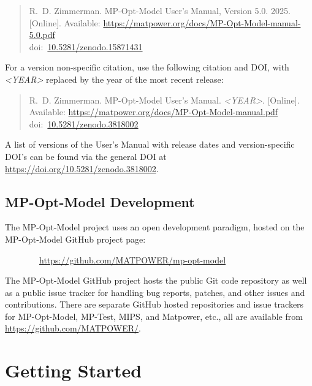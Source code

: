 \documentclass[12pt]{article}
\newcommand{\matpower}[0]{{\sc Matpower}}
\newcommand{\mptest}[0]{{MP-Test}}
\newcommand{\mips}[0]{{MIPS}}
\newcommand{\mpom}[0]{\mbox{MP-Opt-Model}}
\newcommand{\mpomurl}[0]{https://github.com/MATPOWER/mp-opt-model}
\newcommand{\mpomname}[0]{\mpom{}}
\newcommand{\doi}[1]{doi:~\href{https://doi.org/#1}{#1}}
\numberwithin{equation}{section}
\numberwithin{table}{section}
\numberwithin{figure}{section}
\begin{document}
\begin{quote}
\footnotesize
R.~D. Zimmerman. \mpomname{} User's Manual, Version 5.0. 2025. [Online]. Available: \url{https://matpower.org/docs/MP-Opt-Model-manual-5.0.pdf}\\
\doi{10.5281/zenodo.15871431}
\end{quote}
For a version non-specific citation, use the following citation and DOI,
with \emph{\textless{}YEAR\textgreater{}} replaced by the year of the most recent release:

\begin{quote}
\footnotesize
R.~D. Zimmerman. \mpomname{} User's Manual. \emph{\textless{}YEAR\textgreater{}}.
[Online]. Available: \url{https://matpower.org/docs/MP-Opt-Model-manual.pdf}\\
\doi{10.5281/zenodo.3818002}
\end{quote}
A list of versions of the User's Manual with release dates and
version-specific DOI's can be found via the general DOI at
\url{https://doi.org/10.5281/zenodo.3818002}.

\subsection{\mpom{} Development}
\label{sec:development}

The \mpom{} project uses an open development paradigm, hosted on the \mpom{} GitHub project page:

\bigskip

~~~~~~~~\url{\mpomurl}

\bigskip

The \mpom{} GitHub project hosts the public Git code repository as well as a public issue tracker for handling bug reports, patches, and other issues and contributions. There are separate GitHub hosted repositories and issue trackers for \mpom{}, \mptest{}, \mips{}, and \matpower{}, etc., all are available from \url{https://github.com/MATPOWER/}.


\clearpage
\section{Getting Started}

\end{document}
